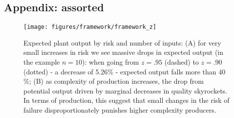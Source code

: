 \documentclass[11pt]{article}
\begin{document}
\begin{appendices}
\newpage

\section{Appendix: assorted}%
\label{sub:appendix_figs}










\begin{figure}[htpb]
	\centering
	\texttt{[image: figures/framework/framework\_z]}
	\caption{Expected plant output by risk and number of inputs: (A) for very small increases in risk we see massive drops in expected output (in the example \(n = 10\)): when going from \(z = .95\) (dashed) to \(z = .90\) (dotted) - a decrease of 5.26\% - expected output falls more than 40 \%; (B) as complexity of production increases, the drop from potential output driven by marginal decreases in quality skyrockets. In terms of production, this suggest that small changes in the risk of failure disproportionately punishes higher complexity producers.}%
	\label{fig:framework-z}
\end{figure}


\newpage 
\end{appendices}
\end{document}
